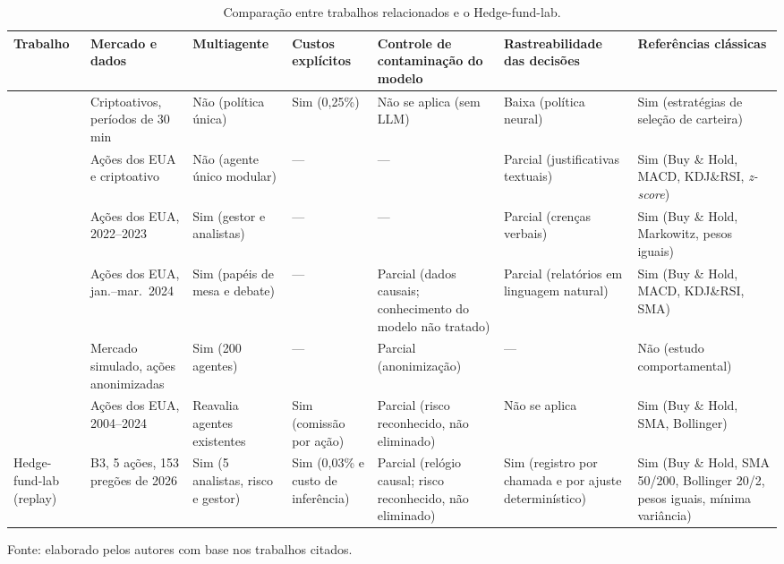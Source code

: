 \documentclass{eic-bcc-tcc}
\begin{document}
\begin{table}[htbp]
\centering
\caption{Comparação entre trabalhos relacionados e o Hedge-fund-lab.}
\label{tab:relacionados}
\footnotesize
\setlength{\tabcolsep}{3pt}
\begin{tabular}{>{\raggedright\arraybackslash}p{1.9cm} >{\raggedright\arraybackslash}p{2.2cm} >{\raggedright\arraybackslash}p{1.8cm} >{\raggedright\arraybackslash}p{1.6cm} >{\raggedright\arraybackslash}p{2.4cm} >{\raggedright\arraybackslash}p{2.0cm} >{\raggedright\arraybackslash}p{2.4cm}}
\toprule
\textbf{Trabalho} & \textbf{Mercado e dados} & \textbf{Multiagente} & \textbf{Custos explícitos} & \textbf{Controle de contaminação do modelo} & \textbf{Rastreabilidade das decisões} & \textbf{Referências clássicas} \\
\midrule
\citet{Jiang2017} & Criptoativos, períodos de 30 min & Não (política única) & Sim (0,25\%) & Não se aplica (sem LLM) & Baixa (política neural) & Sim (estratégias de seleção de carteira) \\
\addlinespace
\citet{FinAgent2024} & Ações dos EUA e criptoativo & Não (agente único modular) & --- & --- & Parcial (justificativas textuais) & Sim (Buy \& Hold, MACD, KDJ\&RSI, \textit{z-score}) \\
\addlinespace
\citet{FinCon2024} & Ações dos EUA, 2022--2023 & Sim (gestor e analistas) & --- & --- & Parcial (crenças verbais) & Sim (Buy \& Hold, Markowitz, pesos iguais) \\
\addlinespace
\citet{TradingAgents2024} & Ações dos EUA, jan.--mar.\ 2024 & Sim (papéis de mesa e debate) & --- & Parcial (dados causais; conhecimento do modelo não tratado) & Parcial (relatórios em linguagem natural) & Sim (Buy \& Hold, MACD, KDJ\&RSI, SMA) \\
\addlinespace
\citet{StockAgent2024} & Mercado simulado, ações anonimizadas & Sim (200 agentes) & --- & Parcial (anonimização) & --- & Não (estudo comportamental) \\
\addlinespace
\citet{FINSABER2026} & Ações dos EUA, 2004--2024 & Reavalia agentes existentes & Sim (comissão por ação) & Parcial (risco reconhecido, não eliminado) & Não se aplica & Sim (Buy \& Hold, SMA, Bollinger) \\
\addlinespace
Hedge-fund-lab (replay) & B3, 5 ações, 153 pregões de 2026 & Sim (5 analistas, risco e gestor) & Sim (0,03\% e custo de inferência) & Parcial (relógio causal; risco reconhecido, não eliminado) & Sim (registro por chamada e por ajuste determinístico) & Sim (Buy \& Hold, SMA 50/200, Bollinger 20/2, pesos iguais, mínima variância) \\
\bottomrule
\end{tabular}

\vspace{2pt}
{\footnotesize Fonte: elaborado pelos autores com base nos trabalhos citados.}
\end{table}
\end{document}
